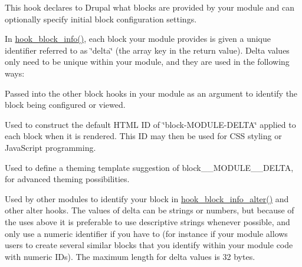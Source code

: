This hook declares to Drupal what blocks are provided by your module and can optionally specify initial block configuration settings.

In \hyperlink{group__hooks_ga2bd926c3e90deeba0c3ba64fb3c64d73}{hook\_\-block\_\-info()}, each block your module provides is given a unique identifier referred to as \char`\"{}delta\char`\"{} (the array key in the return value). Delta values only need to be unique within your module, and they are used in the following ways:
\begin{DoxyItemize}
\item Passed into the other block hooks in your module as an argument to identify the block being configured or viewed.
\item Used to construct the default HTML ID of \char`\"{}block-\/MODULE-\/DELTA\char`\"{} applied to each block when it is rendered. This ID may then be used for CSS styling or JavaScript programming.
\item Used to define a theming template suggestion of block\_\-\_\-MODULE\_\-\_\-DELTA, for advanced theming possibilities.
\item Used by other modules to identify your block in \hyperlink{group__hooks_ga6a57bda0a2640ccadef4d7c8b6d2a26f}{hook\_\-block\_\-info\_\-alter()} and other alter hooks. The values of delta can be strings or numbers, but because of the uses above it is preferable to use descriptive strings whenever possible, and only use a numeric identifier if you have to (for instance if your module allows users to create several similar blocks that you identify within your module code with numeric IDs). The maximum length for delta values is 32 bytes.
\end{DoxyItemize}


